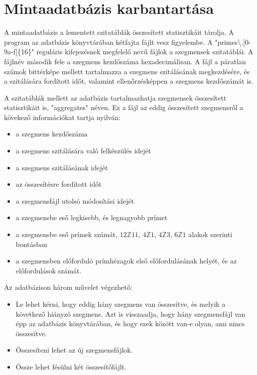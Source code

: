 \documentclass[12pt]{report}
\begin{document}
\section{Mintaadatbázis karbantartása}

A mintaadatbázis a lementett szitatáblák összesített statisztikáit tárolja.
A program az adatbázis könyvtárában kétfajta fájlt vesz figyelembe.  %
A "primes\textbackslash.[0-9a-f]\{16\}" reguláris kifejezésnek megfelelő nevű  %
fájlok a szegmensek szitatáblái.
A fájlnév második fele a szegmens kezdőszáma hexadecimálisan.
A fájl a páratlan számok bittérképe mellett tartalmazza a szegmens
szitálásának megkezdésére, és a szitálására fordított időt,
valamint ellenőrzésképpen a szegmens kezdőszámát is.

A szitatáblák mellett az adatbázis tartalmazhatja szegmensek összesített
statisztikáit is, "aggregates" néven. Ez a fájl az eddig összesített  %
szegmensről a kövekező információkat tartja nyilván:
\begin{itemize}
\item a szegmens kezdőszáma
\item a szegmens szitálására való felkészülés idejét
\item a szegmens szitálásának idejét
\item az összesítésre fordított időt
\item a szegmensfájl utolsó módosítási idejét
\item a szegmensbe eső legkisebb, és legnagyobb prímet
\item a szegmensbe eső prímek számát,
$12\mathbb{Z}11$, $4\mathbb{Z}1$, $4\mathbb{Z}3$, $6\mathbb{Z}1$ alakok szerinti bontásban
\item a szegmensben előforduló prímhézagok első előfordulásának helyét,
és az előfordulások számát.
\end{itemize}

Az adatbázison három művelet végezhető:
\begin{itemize}

\item Le lehet kérni, hogy eddig hány szegmens van összesítve,
és melyik a következő hiányzó szegmens.
Azt is visszaadja, hogy hány szegmensfájl van épp az adatbázis könyvtárában,
és hogy ezek között van-e olyan, ami nincs összesítve.  %

\item Összesíteni lehet az új szegmensfájlok.  %

\item Össze lehet fésülni két összesítőfájlt.

\end{itemize}
\end{document}
